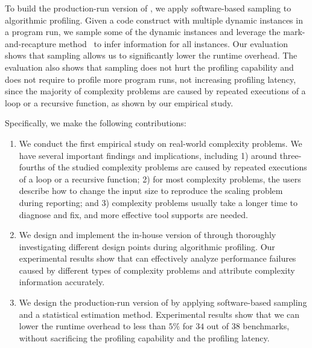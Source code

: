 To build the production-run version of \Tool,
we apply software-based sampling to algorithmic profiling.
Given a code construct with multiple dynamic instances in a program run,
we sample some of the dynamic instances and leverage the mark-and-recapture 
method~\citep{mark-recapture} to infer information for all instances. 
Our evaluation shows that 
sampling allows us to significantly lower the runtime overhead.
The evaluation also shows that sampling does not hurt the profiling capability 
and does not require to profile more program runs, 
not increasing profiling latency, since
the majority of complexity problems are caused by 
repeated executions of a loop or a recursive function, as shown by our empirical study.



Specifically, we make the following contributions:

\begin{enumerate}

\item We conduct the first empirical study on real-world complexity problems. 
We have several important findings and implications, including
1) around three-fourths of the studied complexity problems are 
caused by repeated executions of a loop or a recursive function;
2) for most complexity problems, 
the users describe how to change the input size to reproduce the scaling problem during reporting;
and 3) complexity problems usually take a longer time to diagnose and fix, 
and more effective tool supports are needed.  

\item We design and implement the in-house version of \Tool through 
thoroughly investigating different design points during algorithmic profiling. 
Our experimental results show that \Tool can effectively analyze performance failures 
caused by different types of complexity problems and attribute complexity information accurately.  

\item We design the production-run version of \Tool by applying 
software-based sampling and a statistical estimation method. 
Experimental results show that we can lower the runtime overhead to less than 
$5\%$ for $34$ out of $38$ benchmarks, 
without sacrificing the profiling capability and the profiling latency.  

\end{enumerate}

